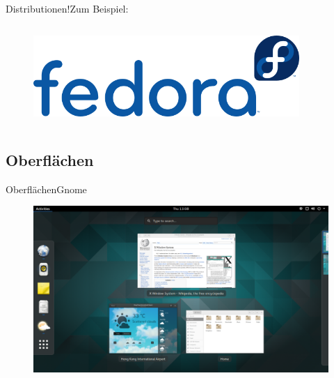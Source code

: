 \begin{frame}{Distributionen!}{Zum Beispiel:}
\begin{columns}
\begin{column}{0.5\textwidth}
\begin{figure}
\includegraphics[width=0.9\textwidth]{resources/640px-Fedora_logo_and_wordmark}
\end{figure}

\end{column}
\end{columns}
\end{frame}

\subsection{Oberflächen}
\begin{frame}{Oberflächen}{Gnome}
\begin{figure}
 \includegraphics[height=0.6\textheight]{resources/1200px-GNOME_Shell.png}
 \end{figure}

\end{frame}

